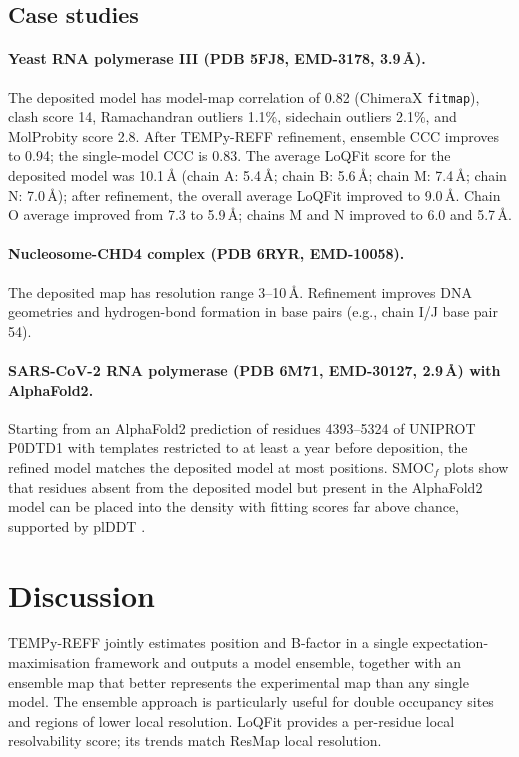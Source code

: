 \documentclass[11pt]{article}
\begin{document}
\subsection{Case studies}
\paragraph{Yeast RNA polymerase III (PDB 5FJ8, EMD-3178, 3.9\,\AA).} The deposited model has model-map correlation of 0.82 (ChimeraX \texttt{fitmap}), clash score 14, Ramachandran outliers 1.1\%, sidechain outliers 2.1\%, and MolProbity score 2.8. After TEMPy-REFF refinement, ensemble CCC improves to 0.94; the single-model CCC is 0.83. The average LoQFit score for the deposited model was 10.1\,\AA{} (chain A: 5.4\,\AA; chain B: 5.6\,\AA; chain M: 7.4\,\AA; chain N: 7.0\,\AA); after refinement, the overall average LoQFit improved to 9.0\,\AA. Chain O average improved from 7.3 to 5.9\,\AA; chains M and N improved to 6.0 and 5.7\,\AA.

\paragraph{Nucleosome-CHD4 complex (PDB 6RYR, EMD-10058).} The deposited map has resolution range 3--10\,\AA. Refinement improves DNA geometries and hydrogen-bond formation in base pairs (e.g., chain I/J base pair 54).

\paragraph{SARS-CoV-2 RNA polymerase (PDB 6M71, EMD-30127, 2.9\,\AA) with AlphaFold2.} Starting from an AlphaFold2 \citep{r41,r42} prediction of residues 4393--5324 of UNIPROT P0DTD1 with templates restricted to at least a year before deposition, the refined model matches the deposited model at most positions. SMOC$_f$ plots show that residues absent from the deposited model but present in the AlphaFold2 model can be placed into the density with fitting scores far above chance, supported by plDDT \citep{r41,r44}.

\section{Discussion}
TEMPy-REFF jointly estimates position and B-factor in a single expectation-maximisation framework and outputs a model ensemble, together with an ensemble map that better represents the experimental map than any single model. The ensemble approach is particularly useful for double occupancy sites and regions of lower local resolution. LoQFit provides a per-residue local resolvability score; its trends match ResMap \citep{r49} local resolution.
\end{document}
